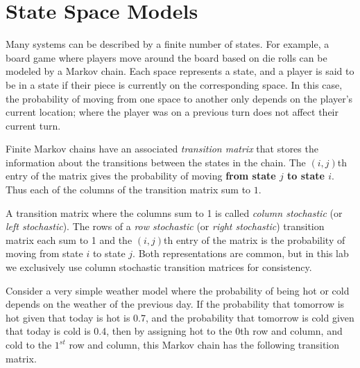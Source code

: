 \label{lab:Markov}

\section*{State Space Models} %

Many systems can be described by a finite number of states.
For example, a board game where players move around the board based on die rolls can be modeled by a Markov chain.
Each space represents a state, and a player is said to be in a state if their piece is currently on the corresponding space.
In this case, the probability of moving from one space to another only depends on the player's current location; where the player was on a previous turn does not affect their current turn.

Finite Markov chains have an associated \emph{transition matrix} that stores the information about the transitions between the states in the chain.
The $(i,j)$th entry of the matrix gives the probability of moving \textbf{from state $j$ to state $i$}.
Thus each of the columns of the transition matrix sum to $1$.

\begin{info} %
A transition matrix where the columns sum to 1 is called \emph{column stochastic} (or \emph{left stochastic}).
The rows of a \emph{row stochastic} (or \emph{right stochastic}) transition matrix each sum to 1 and the $(i,j)$th entry of the matrix is the probability of moving from state $i$ to state $j$.
Both representations are common, but in this lab we exclusively use column stochastic transition matrices for consistency.
\end{info}

Consider a very simple weather model where the probability of being hot or cold depends on the weather of the previous day.
If the probability that tomorrow is hot given that today is hot is 0.7, and the probability that tomorrow is cold given that today is cold is 0.4, then by assigning hot to the $0$th row and column, and cold to the $1^{st}$ row and column, this Markov chain has the following transition matrix.


